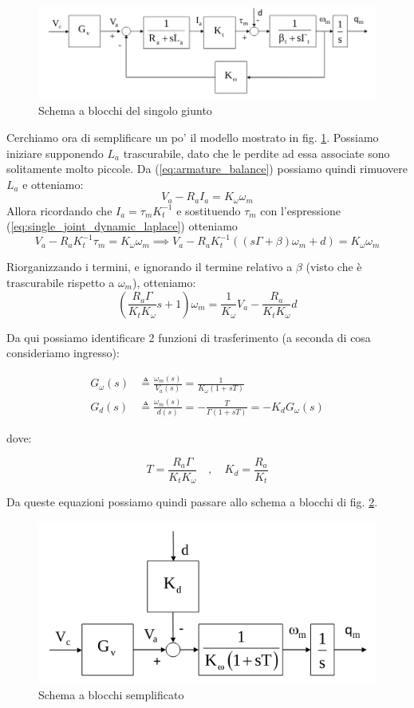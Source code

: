 \begin{figure}[th!]
	\centering
	\includegraphics[width=0.7\linewidth]{images/decentralized_joint_space_control_3}
	\caption{Schema a blocchi del singolo giunto}
	\label{fig:decentralizedjointspacecontrol3}
\end{figure}


Cerchiamo ora di semplificare un po' il modello mostrato in fig. \ref{fig:decentralizedjointspacecontrol3}. Possiamo iniziare supponendo $L_a$ trascurabile, dato che le perdite ad essa associate sono solitamente molto piccole.
Da (\ref{eq:armature_balance}) possiamo quindi rimuovere $L_a$ e otteniamo:
$$
V_a - R_aI_a = K_\omega \omega_m
$$
Allora ricordando che $I_a = \tau_m K_t^{-1}$ e sostituendo $\tau_m$ con l'espressione (\ref{eq:single_joint_dynamic_laplace}) otteniamo 
$$
V_a - R_a K_t^{-1} \tau_m = K_\omega \omega_m
\implies
V_a - R_a K_t^{-1} ((s\Gamma + \beta)\omega_m + d)
= K_\omega \omega_m
$$



Riorganizzando i termini, e ignorando il termine relativo a $\beta$ (visto che è trascurabile rispetto a $\omega_m$), otteniamo:
$$
\left( \frac{R_a \Gamma}{K_t K_\omega}s + 1 \right) \omega_m =
\frac{1}{K_\omega}V_a - \frac{R_a}{K_tK_\omega}d
$$

Da qui possiamo identificare 2 funzioni di trasferimento (a seconda di cosa consideriamo ingresso):

\begin{align}
G_\omega(s) &\triangleq \frac{\omega_m(s)}{V_a(s)} = \frac{1}{K_\omega(1 + sT)} \label{eq:tf_omega} \\
G_d(s) &\triangleq \frac{\omega_m(s)}{d(s)} = -\frac{T}{\Gamma(1 + sT)} = -K_dG_\omega(s)
\end{align}

dove:

$$
T = \frac{R_a \Gamma}{K_t K_\omega} 
\quad , \quad
K_d = \frac{R_a}{K_t}
$$

Da queste equazioni possiamo quindi passare allo schema a blocchi di fig. \ref{fig:decentralizedjointspacecontrol4}.

\begin{figure}[bh!]
	\centering
	\includegraphics[width=0.6\linewidth]{images/decentralized_joint_space_control_4}
	\caption{Schema a blocchi semplificato}
	\label{fig:decentralizedjointspacecontrol4}
\end{figure}




